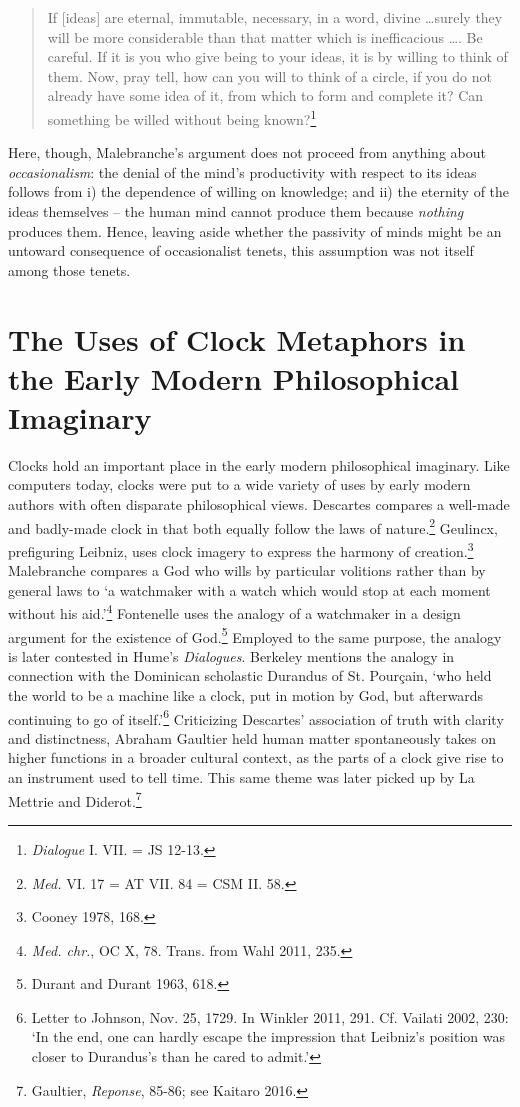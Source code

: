 \documentclass{article}
\begin{document}
\begin{quote}
If {[}ideas{]} are eternal, immutable, necessary, in a word, divine
\ldots surely they will be more considerable than that matter
which is inefficacious \ldots. Be careful. If it is you who give
being to your ideas, it is by willing to think of them. Now, pray tell,
how can you will to think of a circle, if you do not already have some
idea of it, from which to form and complete it? Can something be willed
without being known?\footnote{\emph{Dialogue} I. VII. = JS 12-13.}
\end{quote}

Here, though, Malebranche's argument does not proceed from anything
about \emph{occasionalism}: the denial of the mind's productivity with
respect to its ideas follows from i) the dependence of willing on
knowledge; and ii) the eternity of the ideas themselves -- the human
mind cannot produce them because \emph{nothing} produces them. Hence,
leaving aside whether the passivity of minds might be an untoward
consequence of occasionalist tenets, this assumption was not itself
among those tenets.

\section{The Uses of Clock Metaphors in the Early Modern Philosophical
Imaginary}

Clocks hold an important place in the early modern philosophical
imaginary. Like computers today, clocks were put to a wide variety of
uses by early modern authors with often disparate philosophical views.
Descartes compares a well-made and badly-made clock in that both equally
follow the laws of nature.\footnote{\emph{Med.} VI. 17 = AT VII. 84 =
  CSM II. 58.} Geulincx, prefiguring Leibniz, uses clock imagery to
express the harmony of creation.\footnote{Cooney 1978, 168.} Malebranche
compares a God who wills by particular volitions rather than by general
laws to `a watchmaker with a watch which would stop at each moment
without his aid.'\footnote{\emph{Med. chr.}, OC X, 78. Trans. from Wahl
  2011, 235.} Fontenelle uses the analogy of a watchmaker in a design
argument for the existence of God.\footnote{Durant and Durant 1963, 618.}
Employed to the same purpose, the analogy is later contested in Hume's
\emph{Dialogues}. Berkeley mentions the analogy in connection with the
Dominican scholastic Durandus of St. Pourçain, `who held the world to be
a machine like a clock, put in motion by God, but afterwards continuing
to go of itself.'\footnote{Letter to Johnson, Nov. 25, 1729. In Winkler
  2011, 291. Cf. Vailati 2002, 230: `In the end, one can hardly escape
  the impression that Leibniz's position was closer to Durandus's than
  he cared to admit.'} Criticizing Descartes' association of truth with
clarity and distinctness, Abraham Gaultier held human matter
spontaneously takes on higher functions in a broader cultural context,
as the parts of a clock give rise to an instrument used to tell time.
This same theme was later picked up by La Mettrie and Diderot.\footnote{Gaultier,
  \emph{Reponse}, 85-86; see Kaitaro 2016.}
\end{document}
